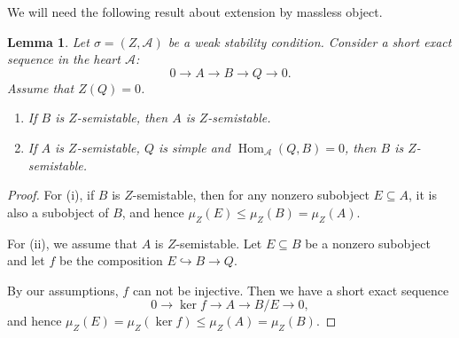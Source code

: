 \documentclass[12pt]{amsart}
\newtheorem{lemma}[theorem]{Lemma}
\theoremstyle{definition}
\DeclareMathOperator{\Hom}{Hom}
\begin{document}
We will need the following result about extension by massless object.
\begin{lemma}\label{massless}
Let $\sigma=(Z,\mathcal{A})$ be a weak stability condition. 
Consider a short exact sequence in the heart $\mathcal{A}$:
\[ 0 \longrightarrow A\longrightarrow B \longrightarrow Q  \longrightarrow 0.\]
Assume that $Z(Q)=0$.
\begin{enumerate}
    \item If $B$ is $Z$-semistable, then $A$ is $Z$-semistable.
    \item If $A$ is $Z$-semistable, $Q$ is simple and $\Hom_{\mathcal{A}}(Q,B)= 0$,
    then $B$ is $Z$-semistable.
\end{enumerate}
\end{lemma}
\begin{proof}
For (i), if $B$ is $Z$-semistable, then for any nonzero subobject $E\subseteq A$, 
it is also a subobject of $B$,
and hence $\mu_Z(E) \leq \mu_Z(B)= \mu_Z(A)$.

For (ii), we assume that $A$ is $Z$-semistable.
Let $E \subseteq B$ be a nonzero subobject and let $f$ be the composition $ E \hookrightarrow B \longrightarrow Q$.

By our assumptions, $f$ can not be injective.
Then we have a short exact sequence 
$$0 \longrightarrow \ker f\longrightarrow A \longrightarrow B/E  \longrightarrow 0,$$
and hence $\mu_Z(E) = \mu_Z(\ker f) \leq \mu_Z(A) = \mu_Z(B)$. 
\end{proof}
\end{document}
